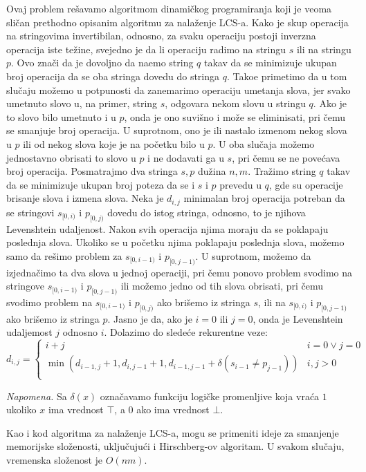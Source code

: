 Ovaj problem re\v savamo algoritmom dinami\v ckog programiranja koji je veoma sli\v can prethodno opisanim algoritmu za nala\v zenje LCS-a. Kako je skup operacija na stringovima invertibilan, odnosno, za svaku operaciju postoji inverzna operacija iste te\v zine, svejedno je da li operaciju radimo na stringu $s$ ili na stringu $p$. Ovo zna\v ci da je dovoljno da na\dj emo string $q$ takav da se minimizuje ukupan broj operacija da se oba stringa dovedu do stringa $q$. Tako\dj e primetimo da u tom slu\v caju mo\v zemo u potpunosti da zanemarimo operaciju umetanja slova, jer svako umetnuto slovo u, na primer, string $s$, odgovara nekom slovu u stringu $q$. Ako je to slovo bilo umetnuto i u $p$, onda je ono suvi\v sno i mo\v ze se eliminisati, pri \v cemu se smanjuje broj operacija. U suprotnom, ono je ili nastalo izmenom nekog slova u $p$ ili od nekog slova koje je na po\v cetku bilo u $p$. U oba slu\v caja mo\v zemo jednostavno obrisati to slovo u $p$ i ne dodavati ga u $s$, pri \v cemu se ne pove\' cava broj operacija. Posmatrajmo dva stringa $s,p$ du\v zina $n,m$. Tra\v zimo string $q$ takav da se minimizuje ukupan broj poteza da se i $s$ i $p$ prevedu u $q$, gde su operacije brisanje slova i izmena slova. Neka je $d_{i,j}$ minimalan broj operacija potreban da se stringovi $s_{[0,i)}$ i $p_{[0,j)}$ dovedu do istog stringa, odnosno, to je njihova Levenshtein udaljenost. Nakon svih operacija njima moraju da se poklapaju poslednja slova. Ukoliko se u po\v cetku njima poklapaju poslednja slova, mo\v zemo samo da re\v simo problem za $s_{[0,i-1)}$ i $p_{[0,j-1)}$. U suprotnom, mo\v zemo da izjedna\v cimo ta dva slova u jednoj operaciji, pri \v cemu ponovo problem svodimo na stringove $s_{[0,i-1)}$ i $p_{[0,j-1)}$ ili mo\v zemo jedno od tih slova obrisati, pri \v cemu svodimo problem na $s_{[0,i-1)}$ i $p_{[0,j)}$ ako bri\v semo iz stringa $s$, ili na $s_{[0,i)}$ i $p_{[0,j-1)}$ ako bri\v semo iz stringa $p$. Jasno je da, ako je $i=0$ ili $j=0$, onda je Levenshtein udaljemost $j$ odnosno $i$. Dolazimo do slede\' ce rekurentne veze:
\begin{equation}
    d_{i,j} = \begin{cases}
        i+j & i=0 \vee j=0 \\
        \min(d_{i-1,j}+1, d_{i,j-1}+1, d_{i-1,j-1}+\delta(s_{i-1} \not = p_{j-1})) & i,j > 0 \\
    \end{cases}
\end{equation}

\textit{Napomena.} Sa $\delta(x)$ ozna\v cavamo funkciju logi\v cke promenljive koja vra\' ca $1$ ukoliko $x$ ima vrednost $\top$, a $0$ ako ima vrednost $\bot$.

\noindent
\begin{minipage}[l]{\textwidth}

\end{minipage}

Kao i kod algoritma za nala\v zenje LCS-a, mogu se primeniti ideje za smanjenje memorijske slo\v zenosti, uklju\v cuju\' ci i Hirschberg-ov algoritam. U svakom slu\v caju, vremenska slo\v zenost je $O(nm)$.